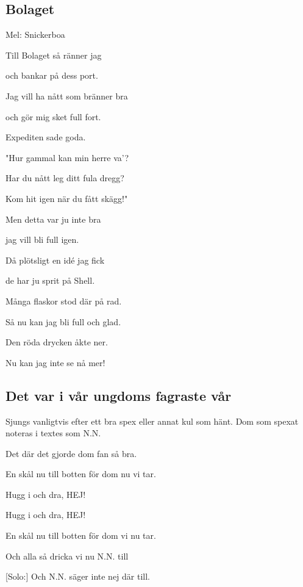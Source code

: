 

\pagestyle{Phestvisor}




\subsection{\textbf{Bolaget}}

Mel: Snickerboa\bigskip

Till Bolaget så ränner jag

och bankar på dess port.

Jag vill ha nått som bränner bra

och gör mig sket full fort.

Expediten sade goda.

"Hur gammal kan min herre va'?

Har du nått leg ditt fula dregg?

Kom hit igen när du fått skägg!"\bigskip

Men detta var ju inte bra

jag vill bli full igen.

Då plötsligt en idé jag fick

de har ju sprit på Shell.

Många flaskor stod där på rad.

Så nu kan jag bli full och glad.

Den röda drycken åkte ner.

Nu kan jag inte se nå mer! 

\subsection{\textbf{Det var i vår ungdoms fagraste vår}}

Sjungs vanligtvis efter ett bra spex eller annat kul som hänt. Dom som spexat noteras i textes som N.N.

Det där det gjorde dom fan så bra.

En skål nu till botten för dom nu vi tar.

Hugg i och dra, HEJ!

Hugg i och dra, HEJ!

En skål nu till botten för dom vi nu tar.\bigskip

Och alla så dricka vi nu N.N. till

[Solo:] Och N.N. säger inte nej där till.\bigskip 

